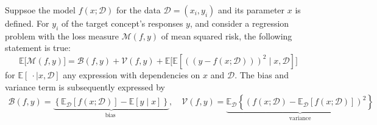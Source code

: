 \begin{theorem}
    Suppsoe the model $f(x;\mathcal{D})$ for the data $\mathcal{D}=(x_i, y_i)$ and its parameter $x$ is defined. For $y_{i}$ of the target concept's responses $y$, and consider a regression problem with the loss measure $\mathcal{M}(f,y)$ of mean squared risk, the following statement is true: \begin{equation}
        \mathbb{E}\big[\mathcal{M}(f,y)\big] = \mathcal{B}(f,y) + \mathcal{V}(f,y) + \mathbb{E}\Big[\mathbb{E} \left[((y-f(x;\mathcal{D})))^{2}\mid x, \mathcal{D}\right]\Big]
    \end{equation}
    for $\mathbb{E}[\:\cdot\mid x, \mathcal{D}]$ any expression with dependencies on $x$ and $\mathcal{D}$. The bias and variance term is subsequently expressed by 
    \begin{align}
        \mathcal{B}(f,y) = \underbrace{\left\{ \mathbb{E}_{\mathcal{D}}[f(x;\mathcal{D})] - \mathbb{E}[y\mid x] \right\}}_{\text{bias }}, \quad \mathcal{V}(f,y) =\underbrace{\mathbb{E}_{\mathcal{D}} \left\{(f(x;\mathcal{D})- \mathbb{E}_{\mathcal{D}}[f(x;\mathcal{D})])^{2}\right\}}_{\text{variance}}
    \end{align}
\end{theorem}

